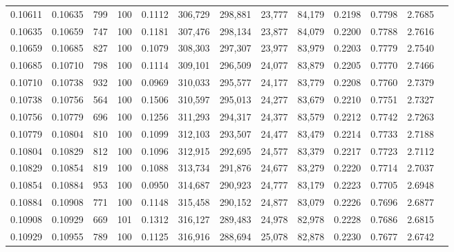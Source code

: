 \begin{tabular}{rrrrrrrrrrrrr}
0.10611 & 0.10635 &   799 & 100 &                                     0.1112 & 306,729 & 298,881 &  23,777 &  84,179 & 0.2198 & 0.7798 & 2.7685 \\
0.10635 & 0.10659 &   747 & 100 &                                     0.1181 & 307,476 & 298,134 &  23,877 &  84,079 & 0.2200 & 0.7788 & 2.7616 \\
0.10659 & 0.10685 &   827 & 100 &                                     0.1079 & 308,303 & 297,307 &  23,977 &  83,979 & 0.2203 & 0.7779 & 2.7540 \\
0.10685 & 0.10710 &   798 & 100 &                                     0.1114 & 309,101 & 296,509 &  24,077 &  83,879 & 0.2205 & 0.7770 & 2.7466 \\
0.10710 & 0.10738 &   932 & 100 &                                     0.0969 & 310,033 & 295,577 &  24,177 &  83,779 & 0.2208 & 0.7760 & 2.7379 \\
0.10738 & 0.10756 &   564 & 100 &                                     0.1506 & 310,597 & 295,013 &  24,277 &  83,679 & 0.2210 & 0.7751 & 2.7327 \\
0.10756 & 0.10779 &   696 & 100 &                                     0.1256 & 311,293 & 294,317 &  24,377 &  83,579 & 0.2212 & 0.7742 & 2.7263 \\
0.10779 & 0.10804 &   810 & 100 &                                     0.1099 & 312,103 & 293,507 &  24,477 &  83,479 & 0.2214 & 0.7733 & 2.7188 \\
0.10804 & 0.10829 &   812 & 100 &                                     0.1096 & 312,915 & 292,695 &  24,577 &  83,379 & 0.2217 & 0.7723 & 2.7112 \\
0.10829 & 0.10854 &   819 & 100 &                                     0.1088 & 313,734 & 291,876 &  24,677 &  83,279 & 0.2220 & 0.7714 & 2.7037 \\
0.10854 & 0.10884 &   953 & 100 &                                     0.0950 & 314,687 & 290,923 &  24,777 &  83,179 & 0.2223 & 0.7705 & 2.6948 \\
0.10884 & 0.10908 &   771 & 100 &                                     0.1148 & 315,458 & 290,152 &  24,877 &  83,079 & 0.2226 & 0.7696 & 2.6877 \\
0.10908 & 0.10929 &   669 & 101 &                                     0.1312 & 316,127 & 289,483 &  24,978 &  82,978 & 0.2228 & 0.7686 & 2.6815 \\
0.10929 & 0.10955 &   789 & 100 &                                     0.1125 & 316,916 & 288,694 &  25,078 &  82,878 & 0.2230 & 0.7677 & 2.6742 \\

\end{tabular}
